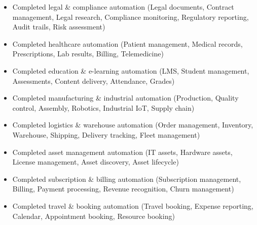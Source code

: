 \documentclass[11pt,a4paper]{article}
\begin{document}
\begin{itemize}
\item Completed legal & compliance automation (Legal documents, Contract management, Legal research, Compliance monitoring, Regulatory reporting, Audit trails, Risk assessment)
\end{itemize}

\begin{itemize}
\item Completed healthcare automation (Patient management, Medical records, Prescriptions, Lab results, Billing, Telemedicine)
\end{itemize}

\begin{itemize}
\item Completed education & e-learning automation (LMS, Student management, Assessments, Content delivery, Attendance, Grades)
\end{itemize}

\begin{itemize}
\item Completed manufacturing & industrial automation (Production, Quality control, Assembly, Robotics, Industrial IoT, Supply chain)
\end{itemize}

\begin{itemize}
\item Completed logistics & warehouse automation (Order management, Inventory, Warehouse, Shipping, Delivery tracking, Fleet management)
\end{itemize}

\begin{itemize}
\item Completed asset management automation (IT assets, Hardware assets, License management, Asset discovery, Asset lifecycle)
\end{itemize}

\begin{itemize}
\item Completed subscription & billing automation (Subscription management, Billing, Payment processing, Revenue recognition, Churn management)
\end{itemize}

\begin{itemize}
\item Completed travel & booking automation (Travel booking, Expense reporting, Calendar, Appointment booking, Resource booking)
\end{itemize}
\end{document}
